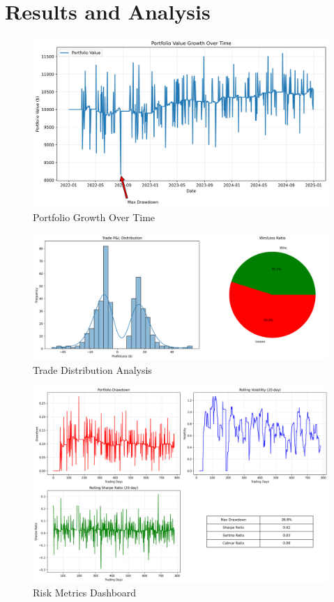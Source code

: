 \documentclass[conference]{IEEEtran}
\begin{document}
\section{Results and Analysis}

\begin{figure}[!t]
\centering
\includegraphics[width=\linewidth]{figures/portfolio_growth.png}
\caption{Portfolio Growth Over Time}
\label{fig:portfolio_growth}
\end{figure}

\begin{figure}[!t]
\centering
\includegraphics[width=\linewidth]{figures/trade_distribution.png}
\caption{Trade Distribution Analysis}
\label{fig:trade_distribution}
\end{figure}

\begin{figure}[!t]
\centering
\includegraphics[width=\linewidth]{figures/risk_metrics.png}
\caption{Risk Metrics Dashboard}
\label{fig:risk_metrics}
\end{figure}
\end{document}
